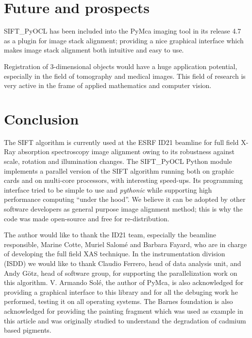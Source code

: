 \documentclass[preprint]{iucr}
\begin{document}
\section{Future and prospects}

SIFT\_PyOCL has been included into the PyMca imaging tool \cite{pymca} in its
release 4.7 as a plugin for image stack alignment; providing a nice graphical
interface which makes image stack alignment both intuitive and easy to use.

Registration of 3-dimensional objects would have a huge application potential,
especially in the field of tomography and medical images.
This field of research is very active in the frame of applied mathematics and
computer vision.


\section{Conclusion}

The SIFT algorithm is currently used at the ESRF ID21 beamline for full field
X-Ray absorption spectroscopy image alignment owing to its robustness against
scale, rotation and illumination changes.
The SIFT\_PyOCL Python module implements a parallel version of the SIFT
algorithm running both on graphic cards and on multi-core processors, with
interesting speed-ups.
Its programming interface tried to be simple to use and \emph{pythonic} while
supporting high performance computing ``under the hood''.
We believe it can be adopted by other software developers as general purpose
image alignment method; this is why the code was made open-source and free for
re-distribution.



The author would like to thank the ID21 team, especially the beamline
responsible, Marine Cotte, Muriel Salomé and Barbara Fayard, who are in charge
of developing the full field XAS technique.
In the instrumentation division (ISDD) we would like to thank Claudio Ferrero,
head of data analysis unit, and Andy G\"otz, head of software group, for
supporting the parallelization work on this algorithm.
V. Armando Solé, the
author of PyMca, is also acknowledged for providing a graphical interface to
this library and for all the debuging work he performed, testing it on all
operating systems.
The Barnes foundation is also acknowledged for providing the
painting fragment which was used as example in this article and was originally studied to
understand the degradation of cadmium based pigments.


\end{document}
